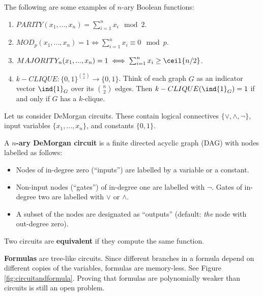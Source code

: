 	\begin{example}
		The following are some examples of $n$-ary Boolean functions:
		\begin{enumerate}
			\item $PARITY(x_1, ..., x_n) = \sum_{i = 1}^{n} x_i \mod 2$.
			\item $MOD_p(x_1, ..., x_n) = 1 \iff \sum_{i = 1}^{n} x_i \equiv 0 \mod p$.
			\item $MAJORITY_n(x_1, ..., x_n) = 1 \iff \sum_{i=1}^{n} x_i \geq \ceil{n/2}$.
			\item $k-CLIQUE: \{0,1\}^{\binom{n}{2}} \rightarrow \{0,1\}$. Think of each graph $G$ as an indicator vector $\ind{1}_G$ over its $\binom{n}{2}$ edges. Then $k-CLIQUE(\ind{1}_G) = 1$ if and only if $G$ has a $k$-clique.
		\end{enumerate}
	\end{example}
	
	Let us consider DeMorgan circuits. These contain logical connectives $\{\lor, \land, \lnot\}$, input variables $\{x_1, ..., x_n\}$, and constants $\{0,1\}$. 
	
	\begin{definition}
		\label{def:demorgancircuit}
		A \textbf{$n$-ary DeMorgan circuit} is a finite directed acyclic graph (DAG) with nodes labelled as follows:
		\begin{itemize}
			\item Nodes of in-degree zero (``inputs'') are labelled by a variable or a constant.
			\item Non-input nodes (``gates'') of in-degree one are labelled with $\lnot$. Gates of in-degree two are labelled with $\lor$ or $\land$.
			\item A subset of the nodes are designated as ``outputs'' (default: \emph{the} node with out-degree zero).
		\end{itemize}
		Two circuits are \textbf{equivalent} if they compute the same function.
	\end{definition}
	
	\textbf{Formulas} are tree-like circuits. Since different branches in a formula depend on different copies of the variables, formulas are memory-less. See Figure \ref{fig:circuitandformula}. Proving that formulas are polynomially weaker than circuits is still an open problem.
	

